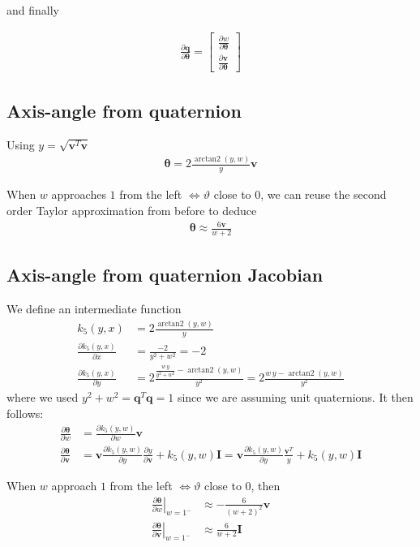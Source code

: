 \documentclass{article}
\renewcommand\aa{\bm{\theta}}
\renewcommand\t{\vartheta}
\newcommand\q{\bm{q}}
\newcommand\I{\bm{I}}
\renewcommand\v{\bm{v}}
\DeclareMathOperator{\arctantwo}{arctan2}
\begin{document}
and finally

\begin{align}
  \frac{\partial \q}{\partial \aa} = 
    \begin{bmatrix}
      \frac{\partial w}{\partial \aa} \\[5pt]
      \frac{\partial \v}{\partial \aa}
    \end{bmatrix}
\end{align}

\subsection{Axis-angle from quaternion}
Using $y=\sqrt{\v^T\v}$
\begin{align}
  \aa = 2 \frac{\arctantwo \left(y, w \right)}{y} \v 
\end{align}

When $w$ approaches $1$ from the left $\iff \t$ close to $0$, we can reuse the second order Taylor approximation from before to deduce
\begin{align}
  \aa \approx \frac{6\v}{w+2}
\end{align}

\subsection{Axis-angle from quaternion Jacobian}
We define an intermediate function
\begin{align}
  k_5(y,x) &= 2 \frac{\arctantwo \left(y, w \right)}{y} \\
  \frac{\partial k_5(y,x)}{\partial x} &= \frac{-2}{y^2 + w^2} = -2 \\
  \frac{\partial k_5(y,x)}{\partial y} &= 2 \frac{ \frac{w\,y}{y^2 + w^2} - \arctantwo \left(y, w \right)}{y^2} = 2 \frac{ w\,y - \arctantwo \left(y, w \right)}{y^2}
\end{align}
where we used $y^2 + w^2 = \q^T \q = 1$ since we are assuming unit quaternions. It then follows:
\begin{align}
  \frac{\partial \aa}{\partial w} &= \frac{\partial k_5(y,w)}{\partial w} \v \\
  \frac{\partial \aa}{\partial \v} 
  &= \v \frac{\partial k_5(y,w)}{\partial y} \frac{\partial y}{\partial \v} + k_5(y,w) \I
  =  \v \frac{\partial k_5(y,w)}{\partial y} \frac{\v^T}{y} + k_5(y,w) \I
\end{align}

When $w$ approach $1$ from the left $\iff \t$ close to $0$, then
\begin{align}
  \left. \frac{\partial \aa}{\partial w} \right \vert_{w = 1^-} &\approx - \frac{6}{\left( w + 2 \right)^2} \v \\
  \left. \frac{\partial \aa}{\partial \v} \right \vert_{w = 1^-} &\approx \frac{6}{w + 2} \I
\end{align}
\end{document}

